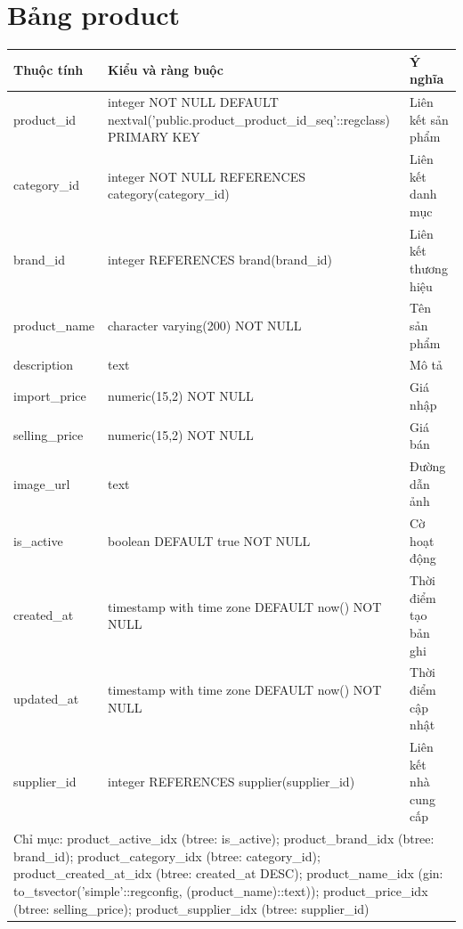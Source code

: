 \section{Bảng product}
\begin{longtable}{|p{}|p{}|p{}|}\hline
\textbf{Thuộc tính}&\textbf{Kiểu và ràng buộc}&\textbf{Ý nghĩa}\\\hline\endhead
product\_id & integer NOT NULL DEFAULT nextval('public.product\_product\_id\_seq'::regclass) PRIMARY KEY & Liên kết sản phẩm\\\hline
category\_id & integer NOT NULL REFERENCES category(category\_id) & Liên kết danh mục\\\hline
brand\_id & integer REFERENCES brand(brand\_id) & Liên kết thương hiệu\\\hline
product\_name & character varying(200) NOT NULL & Tên sản phẩm\\\hline
description & text & Mô tả\\\hline
import\_price & numeric(15,2) NOT NULL & Giá nhập\\\hline
selling\_price & numeric(15,2) NOT NULL & Giá bán\\\hline
image\_url & text & Đường dẫn ảnh\\\hline
is\_active & boolean DEFAULT true NOT NULL & Cờ hoạt động\\\hline
created\_at & timestamp with time zone DEFAULT now() NOT NULL & Thời điểm tạo bản ghi\\\hline
updated\_at & timestamp with time zone DEFAULT now() NOT NULL & Thời điểm cập nhật\\\hline
supplier\_id & integer REFERENCES supplier(supplier\_id) & Liên kết nhà cung cấp\\\hline
\multicolumn{3}{|p{0.93\textwidth}|}{Chỉ mục: product\_active\_idx (btree: is\_active); product\_brand\_idx (btree: brand\_id); product\_category\_idx (btree: category\_id); product\_created\_at\_idx (btree: created\_at DESC); product\_name\_idx (gin: to\_tsvector('simple'::regconfig, (product\_name)::text)); product\_price\_idx (btree: selling\_price); product\_supplier\_idx (btree: supplier\_id)}\\\hline
\end{longtable}
\normalsize
